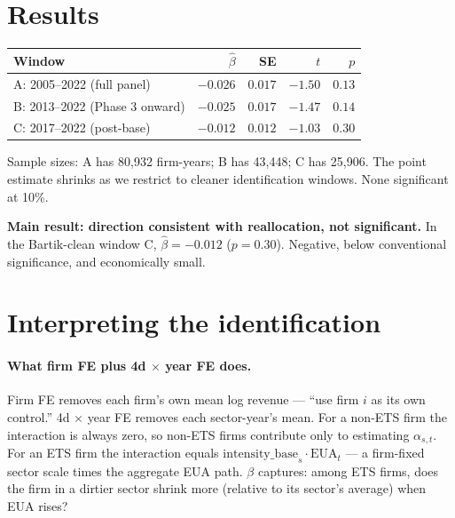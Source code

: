 \documentclass[11pt]{article}
\begin{document}
\section{Results}

\begin{center}
\begin{tabular}{lrrrr}
\toprule
Window & $\hat\beta$ & SE & $t$ & $p$ \\
\midrule
A: 2005--2022 (full panel)            & $-0.026$ & $0.017$ & $-1.50$ & $0.13$ \\
B: 2013--2022 (Phase 3 onward)        & $-0.025$ & $0.017$ & $-1.47$ & $0.14$ \\
C: 2017--2022 (post-base)             & $-0.012$ & $0.012$ & $-1.03$ & $0.30$ \\
\bottomrule
\end{tabular}
\end{center}

Sample sizes: A has 80{,}932 firm-years; B has 43{,}448; C has 25{,}906. The point estimate shrinks as we restrict to cleaner identification windows. None significant at 10\%.

\textbf{Main result: direction consistent with reallocation, not significant.} In the Bartik-clean window C, $\hat\beta = -0.012$ ($p = 0.30$). Negative, below conventional significance, and economically small.

\section{Interpreting the identification}

\paragraph{What firm FE plus 4d $\times$ year FE does.} Firm FE removes each firm's own mean log revenue --- ``use firm $i$ as its own control.'' 4d $\times$ year FE removes each sector-year's mean. For a non-ETS firm the interaction is always zero, so non-ETS firms contribute only to estimating $\alpha_{s,t}$. For an ETS firm the interaction equals $\mathrm{intensity\_base}_s \cdot \mathrm{EUA}_t$ --- a firm-fixed sector scale times the aggregate EUA path. $\beta$ captures: among ETS firms, does the firm in a dirtier sector shrink more (relative to its sector's average) when EUA rises?
\end{document}
